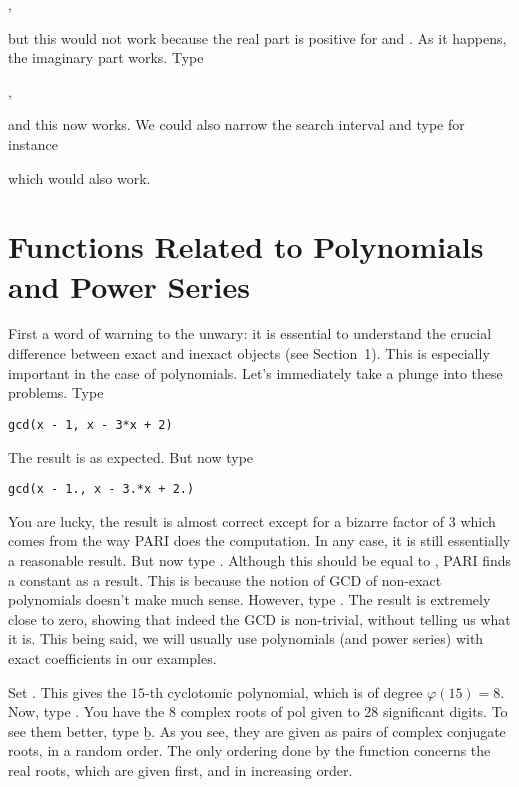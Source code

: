 ,

\noindent but this would not work because the real part is positive for
 and . As it happens, the imaginary part works. Type

,

\noindent and this now works. We could also narrow the search interval and
type for instance


\noindent which would also work.

\section{Functions Related to Polynomials and Power Series}

First a word of warning to the unwary: it is essential to understand the
crucial difference between exact and inexact objects (see Section~1). This
is especially important in the case of polynomials. Let's immediately take
a plunge into these problems. Type

\centerline{\tt gcd(x - 1, x - 3*x + 2)}

\noindent The result is  as expected. But now type

\centerline{\tt gcd(x - 1., x - 3.*x + 2.)}

You are lucky, the result is almost correct except for a bizarre factor of
3 which comes from the way PARI does the computation. In any case, it is still
essentially a reasonable result. But now type
.
Although this should be equal to , PARI finds a
constant as a result. This is because the notion of GCD of non-exact
polynomials doesn't make much sense. However, type
.
The result is extremely close to zero, showing that indeed the GCD is
non-trivial, without telling us what it is. This being said, we will usually
use polynomials (and power series) with exact coefficients in our
examples.\smallskip

Set . This gives the $15$-th cyclotomic polynomial,
which is of degree $\varphi(15)=8$. Now, type . You
have the 8 complex roots of pol given to 28 significant digits. To see them
better, type \b{b}. As you see, they are given as pairs of complex conjugate
roots, in a random order. The only ordering done by the function
 concerns the real roots, which are given first, and in
increasing order.

